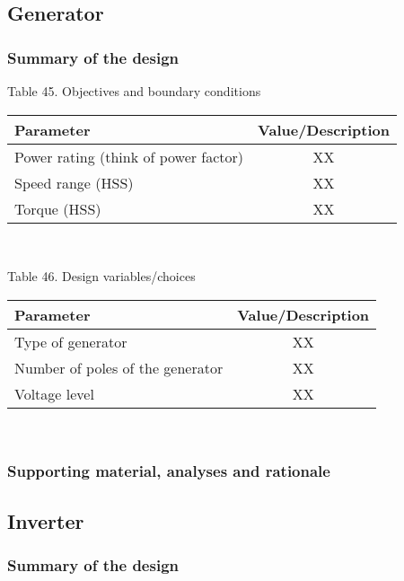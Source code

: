\subsection{Generator}

\subsubsection{Summary of the design}

\begin{center}
Table 45. Objectives and boundary conditions\\
\begin{tabular}{ |l|c| } 
\hline
\textbf{Parameter} & \textbf{Value/Description}  \\ 
\hline
Power rating (think of power factor) & XX \\
\hline
Speed range (HSS) & XX \\
\hline
Torque (HSS) & XX \\
\hline
\end{tabular} \\
\end{center}

\begin{center}
Table 46. Design variables/choices\\
\begin{tabular}{ |l|c| } 
\hline
\textbf{Parameter} & \textbf{Value/Description}  \\ 
\hline
Type of generator & XX  \\ 
\hline
Number of poles of the generator & XX \\
\hline
Voltage level & XX \\
\hline
\end{tabular} \\
\end{center}

\subsubsection{Supporting material, analyses and rationale}



\subsection{Inverter}

\subsubsection{Summary of the design}

